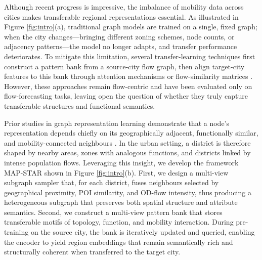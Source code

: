 Although recent progress is impressive, the imbalance of mobility data across cities makes transferable regional representations essential. As illustrated in Figure \ref{fig:intro}(a), traditional graph models are trained on a single, fixed graph; when the city changes—bringing different zoning schemes, node counts, or adjacency patterns—the model no longer adapts, and transfer performance deteriorates. To mitigate this limitation, several transfer-learning techniques first construct a pattern bank from a source-city flow graph, then align target-city features to this bank through attention mechanisms \cite{TPB} or flow-similarity matrices \cite{TransGTR}. However, these approaches remain flow-centric and have been evaluated only on flow-forecasting tasks, leaving open the question of whether they truly capture transferable structures and functional semantics.

Prior studies in graph representation learning demonstrate that a node’s representation depends chiefly on its geographically adjacent, functionally similar, and mobility-connected neighbours \cite{DeepWalk, GAT, GCN}. In the urban setting, a district is therefore shaped by nearby areas, zones with analogous functions, and districts linked by intense population flows. Leveraging this insight, we develop the framework MAP-STAR shown in Figure \ref{fig:intro}(b). First, we design a multi-view subgraph sampler that, for each district, fuses neighbours selected by geographical proximity, POI similarity, and OD-flow intensity, thus producing a heterogeneous subgraph that preserves both spatial structure and attribute semantics. Second, we construct a multi-view pattern bank that stores transferable motifs of topology, function, and mobility interaction. During pre-training on the source city, the bank is iteratively updated and queried, enabling the encoder to yield region embeddings that remain semantically rich and structurally coherent when transferred to the target city.



